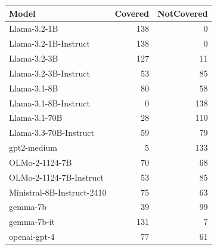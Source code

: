 \begin{tabular}{lrr}
\toprule
Model & Covered & NotCovered \\
\midrule
Llama-3.2-1B & 138 & 0 \\
Llama-3.2-1B-Instruct & 138 & 0 \\
Llama-3.2-3B & 127 & 11 \\
Llama-3.2-3B-Instruct & 53 & 85 \\
Llama-3.1-8B & 80 & 58 \\
Llama-3.1-8B-Instruct & 0 & 138 \\
Llama-3.1-70B & 28 & 110 \\
Llama-3.3-70B-Instruct & 59 & 79 \\
gpt2-medium & 5 & 133 \\
OLMo-2-1124-7B & 70 & 68 \\
OLMo-2-1124-7B-Instruct & 53 & 85 \\
Ministral-8B-Instruct-2410 & 75 & 63 \\
gemma-7b & 39 & 99 \\
gemma-7b-it & 131 & 7 \\
openai-gpt-4 & 77 & 61 \\
\bottomrule
\end{tabular}
